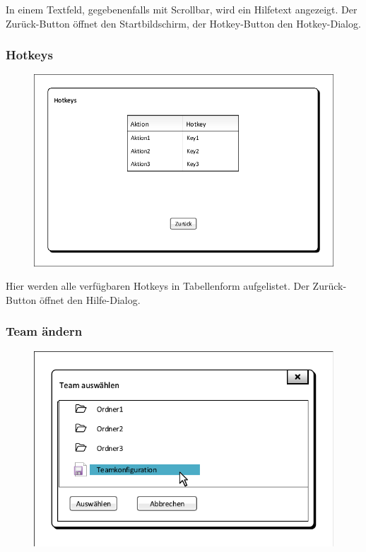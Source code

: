 In einem Textfeld, gegebenenfalls mit Scrollbar, wird ein Hilfetext angezeigt. Der \glqq{}Zurück\grqq{}-Button öffnet den Startbildschirm, der \glqq{}Hotkey\grqq{}-Button den Hotkey-Dialog.

\subsubsection{Hotkeys}
\begin{figure}[H]
    \centering
    \includegraphics[scale=0.8]{images/Hotkeys.pdf}
\end{figure}

Hier werden alle verfügbaren Hotkeys in Tabellenform aufgelistet. Der \glqq{}Zurück\grqq{}-Button öffnet den Hilfe-Dialog.

\subsubsection{Team ändern}
\begin{figure}[H]
    \centering
    \includegraphics[scale=0.8]{images/Teamauswahl_Popup.pdf}
\end{figure}

